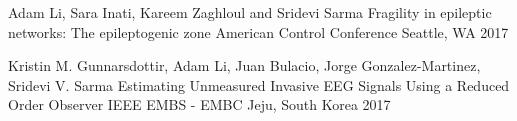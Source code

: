 \begin{cventries}
    \cvpresentation
    {Adam Li, Sara Inati, Kareem Zaghloul and Sridevi Sarma} %
    {Fragility in epileptic networks: The epileptogenic zone} %
    {American Control Conference} %
    {Seattle, WA 2017} %
    {\empty}
    {\empty}
    \vspace{-0.9cm}
    
    \cvpresentation
    {Kristin M. Gunnarsdottir, Adam Li, Juan Bulacio, Jorge Gonzalez-Martinez, Sridevi V. Sarma} %
    {Estimating Unmeasured Invasive EEG Signals Using a Reduced Order Observer} %
    {IEEE EMBS - EMBC} %
    {Jeju, South Korea 2017} %
    {\empty}
    {\empty}
    \vspace{-0.9cm}
    
\end{cventries}